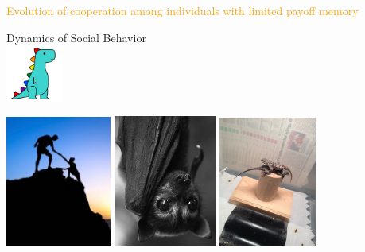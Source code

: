\documentclass{beamer}
\begin{document}
\begin{frame}
    \begin{center}
        \Large{\textcolor{orange}{Evolution of cooperation among individuals with limited payoff memory}} \\
        \vspace{.5cm}

        \vspace{1cm}
        \normalsize{Dynamics of Social Behavior} \\
        \vspace{.5cm}
        \includegraphics[width=0.14\textwidth]{static/dyno.png}

    \end{center}
\end{frame}


\begin{frame}
    \begin{center}
    \includegraphics[width=0.26\textwidth]{static/Being-Human.jpeg}\hspace{8pt}
    \includegraphics[width=0.254\textwidth]{static/vampire_bat.jpg}\hspace{8pt}
    \includegraphics[width=0.24\textwidth]{static/lizard-cooperation.jpg}
    \end{center}
\end{frame}
\end{document}
